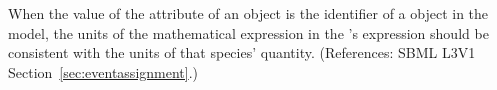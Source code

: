When the value of the attribute  of an \EventAssignment
object is the identifier of a \Species object in the model, the units of
the mathematical expression in the \EventAssignment's 
expression should be consistent with the units of that species' quantity.
(References: SBML L3V1 Section~\ref{sec:eventassignment}.)
